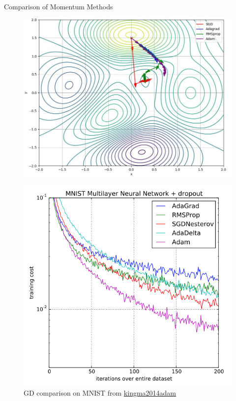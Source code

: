 \documentclass[serif, aspectratio=169]{beamer}
\begin{document}
\begin{frame}{Comparison of Momentum Methods}
    \begin{minipage}{0.5\textwidth}
        \centering
        \begin{center}
        \begin{figure}
        \centering
            \includegraphics[width=1\linewidth]{pic/all_moment.jpg}
        \end{figure}
        \end{center}
    \end{minipage}%
    \begin{minipage}{0.5\textwidth}
        \centering
        \begin{center}
        \begin{figure}
        \centering
            \includegraphics[width=0.8\linewidth]{pic/Adam_training_kingma2015.png}
            \caption{\footnotesize GD comparison on MNIST from \url{kingma2014adam}}
        \end{figure}
        \end{center}
    \end{minipage}
\end{frame}
%     
%     
\end{document}
